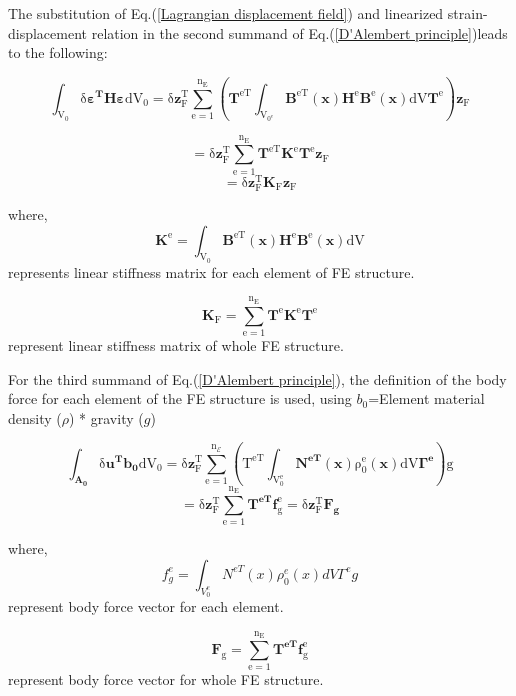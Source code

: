 The substitution of Eq.(\ref{Lagrangian displacement field}) and
linearized strain-displacement relation in the second summand of Eq.(\ref{D'Alembert principle})leads
to the following:


\begin{equation}
\mathrm{\mathrm{\int_{V_{0}}\delta\mathbf{\varepsilon^{T}H\varepsilon}dV_{0}=\delta\mathbf{z}_{F}^{T}\sum_{e=1}^{n_{E}}(\mathbf{T}^{eT}\int_{V_{0^{e}}}\mathbf{B}^{eT}(\mathbf{x})\mathbf{H}^{e}\mathbf{B}^{e}(\mathbf{x})dV\mathbf{T}^{e})\mathbf{z}_{F}}}
\end{equation}


\[
\mathrm{\mathrm{=\delta}\mathbf{z}_{F}^{T}\sum_{e=1}^{n_{E}}\mathbf{T}^{eT}\mathbf{K}^{e}\mathbf{T}^{e}\mathbf{\mathbf{z}}_{F}}
\]
\begin{equation}
\mathrm{\mathrm{=\delta}\mathbf{z}_{F}^{T}\mathbf{K}_{F}\mathbf{z}_{F}}\label{second term of D'Alembert principle}
\end{equation}


where,
\[
\mathrm{\mathbf{K}^{e}=\int_{V_{0}}\mathbf{B}^{eT}(\mathbf{x})\mathbf{H}^{e}\mathbf{B}^{e}(\mathbf{x})dV}
\]
represents linear stiffness matrix for each element of FE structure.

\[
\mathrm{\mathbf{K}_{F}=\sum_{e=1}^{n_{E}}\mathbf{T}^{e}\mathbf{K}^{e}\mathbf{T}^{e}}
\]
represent linear stiffness matrix of whole FE structure.


For the third summand of Eq.(\ref{D'Alembert principle}), the definition
of the body force for each element of the FE structure is used, using
$b_{0}$=Element material density ($\rho$) {*} gravity ($g$)

\begin{equation}
\mathrm{\mathrm{\int_{\mathbf{A_{0}}}\delta\mathbf{u^{T}}\mathbf{b_{0}}dV_{0}=\delta\mathbf{z}_{F}^{T}\sum_{e=1}^{n_{\mathcal{E}}}(T^{eT}\int_{V_{0}^{e}}\mathbf{N^{eT}}(\mathbf{x})\rho_{0}^{e}(\mathbf{x})dV\mathbf{\Gamma^{e}})g}}
\end{equation}
\begin{equation}
\mathrm{\mathrm{=\delta\mathbf{z}_{F}^{T}\sum_{e=1}^{n_{E}}\mathbf{T^{eT}}\mathbf{f}_{g}^{e}=\delta\mathbf{z}_{F}^{T}\mathbf{F_{g}}}}\label{third term of D'Alembert principle}
\end{equation}

where,
\[
f_{g}^{e} = \int_{V_{0}^{e}} N^{eT}(x) \rho_{0}^{e}(x) dV \Gamma^{e}g
\]
represent body force vector for each element.

\[
\mathrm{\mathbf{F}_{g}=\sum_{e=1}^{n_{E}}\mathbf{T^{eT}}\mathbf{f}_{g}^{e}}
\]
represent body force vector for whole FE structure.

